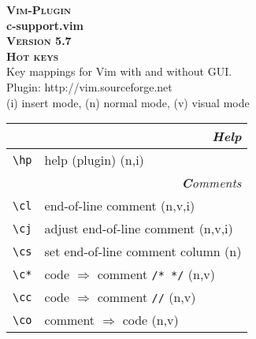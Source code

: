 \documentclass[oneside,10pt,landscape,DIV17]{scrartcl}
\newcommand{\Pluginversion}{5.7}
\begin{document}
%

\begin{multicols}{3}
%
\begin{center}
\textbf{\textsc{\small{Vim-Plugin}}}\\
\textbf{\LARGE{c-support.vim}}\\
\textbf{\textsc{\small{Version \Pluginversion}}}\\
\textbf{\textsc{\Huge{Hot keys}}}\\ 
Key mappings for Vim with and without GUI.\\
Plugin: http://vim.sourceforge.net\\
{\normalsize (i)} insert mode, {\normalsize (n)} normal mode, {\normalsize (v)} visual mode\\
\vspace{1.0mm}
%
\begin{tabular}[]{|p{13mm}|p{56mm}|}
\hline 
\multicolumn{2}{|r|}{\textsl{\textbf{H}elp}}\\
\hline \verb'\hp'   & help (plugin) \hfill (n,i)\\
\hline 
\hline
\multicolumn{2}{|r|}{\textsl{\textbf{C}omments}} \\
\hline \verb'\cl' & end-of-line comment                     \hfill (n,v,i)\\
\hline \verb'\cj' & adjust end-of-line comment              \hfill (n,v,i)\\
\hline \verb'\cs' & set end-of-line comment column          \hfill (n)    \\
\hline \verb'\c*' & code $\Rightarrow$ comment \verb'/* */' \hfill (n,v)  \\
\hline \verb'\cc' & code $\Rightarrow$ comment \verb'//'    \hfill (n,v)  \\
\hline \verb'\co' & comment $\Rightarrow$ code              \hfill (n,v)  \\


\end{tabular}
\end{center}
\end{multicols}
\end{document}
